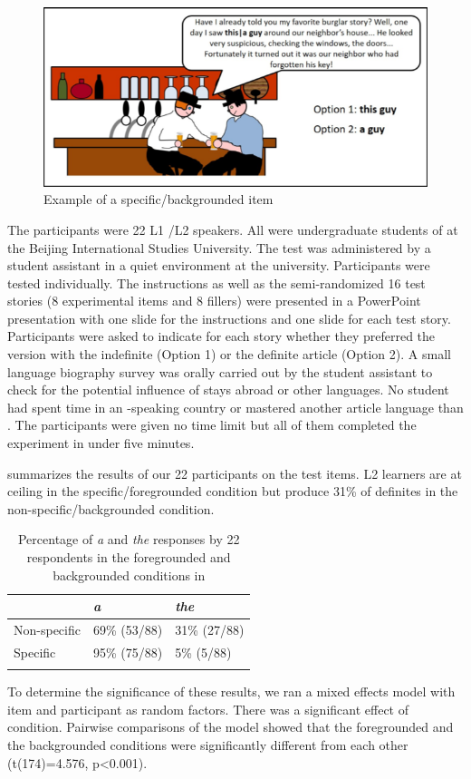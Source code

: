 \documentclass[output=paper,
modfonts
]{langscibook}
\begin{document}
\begin{figure}[h]
\includegraphics[height=.25\textheight]{figures/fig2.png}
\caption{Example of a specific/backgrounded item}
\label{fig:lebruyn:2}
\end{figure}

The participants were 22 L1 /L2  speakers. All were undergraduate students of  at the Beijing International Studies University. The test was administered by a student assistant in a quiet environment at the university. Participants were tested individually. The instructions as well as the semi-randomized 16 test stories (8 experimental items and 8 fillers) were presented in a PowerPoint presentation with one slide for the instructions and one slide for each test story. Participants were asked to indicate for each story whether they preferred the version with the indefinite (Option 1) or the definite article (Option 2). A small language biography survey was orally carried out by the student assistant to check for the potential influence of stays abroad or other languages. No student had spent time in an -speaking country or mastered another article language than . The participants were given no time limit but all of them completed the experiment in under five minutes.

 summarizes the results of our 22 participants on the test items. L2 learners are at ceiling in the specific/foregrounded condition but produce 31\% of definites in the non-specific/backgrounded condition.

\begin{table}[h]
\begin{tabularx}{.66\textwidth}{XXX}
\lsptoprule
 & \textit{a} & \textit{the} \\
\midrule
Non-specific & 69\% (53/88) & 31\% (27/88)  \\
Specific & 95\% (75/88) & 5\% (5/88) \\
\lspbottomrule
\end{tabularx}
\caption{Percentage of \textit{a} and \textit{the} responses by 22  respondents in the foregrounded and backgrounded conditions in \citet{LeBruynDong2017T}}
\label{tab:lebruyn:7}
\end{table}
\newpage
To determine the significance of these results, we ran a mixed effects model with item and participant as random factors. There was a significant effect of condition. Pairwise comparisons of the model showed that the foregrounded and the backgrounded conditions were significantly different from each other (t(174)=4.576, p<0.001).
\end{document}
